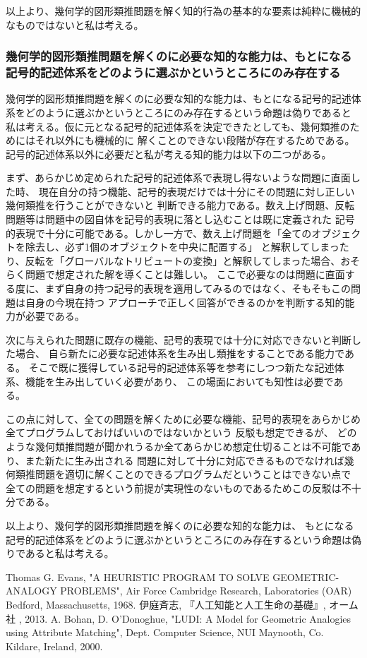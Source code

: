 \documentclass[uplatex]{jsarticle}
\begin{document}
以上より、幾何学的図形類推問題を解く知的行為の基本的な要素は純粋に機械的なものではないと私は考える。

\subsubsection{幾何学的図形類推問題を解くのに必要な知的な能力は、もとになる記号的記述体系をどのように選ぶかというところにのみ存在する}
幾何学的図形類推問題を解くのに必要な知的な能力は、もとになる記号的記述体系をどのように選ぶかというところにのみ存在するという命題は偽りであると
私は考える。仮に元となる記号的記述体系を決定できたとしても、幾何類推のためにはそれ以外にも機械的に
解くことのできない段階が存在するためである。記号的記述体系以外に必要だと私が考える知的能力は以下の二つがある。

まず、あらかじめ定められた記号的記述体系で表現し得ないような問題に直面した時、
現在自分の持つ機能、記号的表現だけでは十分にその問題に対し正しい幾何類推を行うことができないと
判断できる能力である。数え上げ問題、反転問題等は問題中の図自体を記号的表現に落とし込むことは既に定義された
記号的表現で十分に可能である。しかし一方で、数え上げ問題を「全てのオブジェクトを除去し、必ず1個のオブジェクトを中央に配置する」
と解釈してしまったり、反転を「グローバルなトリビュートの変換」と解釈してしまった場合、おそらく問題で想定された解を導くことは難しい。
ここで必要なのは問題に直面する度に、まず自身の持つ記号的表現を適用してみるのではなく、そもそもこの問題は自身の今現在持つ
アプローチで正しく回答ができるのかを判断する知的能力が必要である。

次に与えられた問題に既存の機能、記号的表現では十分に対応できないと判断した場合、
自ら新たに必要な記述体系を生み出し類推をすることである能力である。
そこで既に獲得している記号的記述体系等を参考にしつつ新たな記述体系、機能を生み出していく必要があり、
この場面においても知性は必要である。

この点に対して、全ての問題を解くために必要な機能、記号的表現をあらかじめ全てプログラムしておけばいいのではないかという
反駁も想定できるが、
どのような幾何類推問題が聞かれうるか全てあらかじめ想定仕切ることは不可能であり、また新たに生み出される
問題に対して十分に対応できるものでなければ幾何類推問題を適切に解くことのできるプログラムだということはできない点で
全ての問題を想定するという前提が実現性のないものであるためこの反駁は不十分である。

以上より、幾何学的図形類推問題を解くのに必要な知的な能力は、
もとになる記号的記述体系をどのように選ぶかというところにのみ存在するという命題は偽りであると私は考える。


\begin{thebibliography}{9}
   Thomas G. Evans,
    "A HEURISTIC PROGRAM TO SOLVE GEOMETRIC-ANALOGY PROBLEMS", Air Force Cambridge Research, Laboratories (OAR) Bedford, Massachusetts, 1968.
   伊庭斉志,
    『人工知能と人工生命の基礎』, オーム社 , 2013.
   A. Bohan, D. O'Donoghue, "LUDI: A Model for Geometric Analogies using Attribute Matching",
  Dept. Computer Science, NUI Maynooth, Co. Kildare, Ireland, 2000.
\end{thebibliography}
\end{document}
